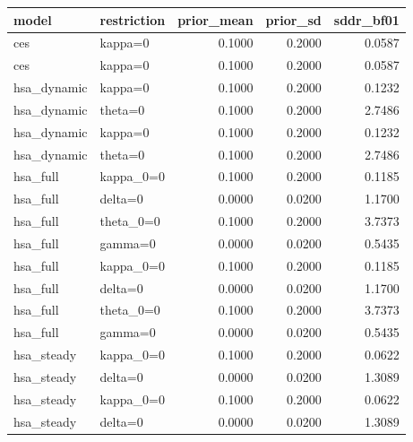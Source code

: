 \begin{tabular}{llrrr}
\toprule
model & restriction & prior\_mean & prior\_sd & sddr\_bf01 \\
\midrule
ces & kappa=0 & 0.1000 & 0.2000 & 0.0587 \\
ces & kappa=0 & 0.1000 & 0.2000 & 0.0587 \\
hsa\_dynamic & kappa=0 & 0.1000 & 0.2000 & 0.1232 \\
hsa\_dynamic & theta=0 & 0.1000 & 0.2000 & 2.7486 \\
hsa\_dynamic & kappa=0 & 0.1000 & 0.2000 & 0.1232 \\
hsa\_dynamic & theta=0 & 0.1000 & 0.2000 & 2.7486 \\
hsa\_full & kappa\_0=0 & 0.1000 & 0.2000 & 0.1185 \\
hsa\_full & delta=0 & 0.0000 & 0.0200 & 1.1700 \\
hsa\_full & theta\_0=0 & 0.1000 & 0.2000 & 3.7373 \\
hsa\_full & gamma=0 & 0.0000 & 0.0200 & 0.5435 \\
hsa\_full & kappa\_0=0 & 0.1000 & 0.2000 & 0.1185 \\
hsa\_full & delta=0 & 0.0000 & 0.0200 & 1.1700 \\
hsa\_full & theta\_0=0 & 0.1000 & 0.2000 & 3.7373 \\
hsa\_full & gamma=0 & 0.0000 & 0.0200 & 0.5435 \\
hsa\_steady & kappa\_0=0 & 0.1000 & 0.2000 & 0.0622 \\
hsa\_steady & delta=0 & 0.0000 & 0.0200 & 1.3089 \\
hsa\_steady & kappa\_0=0 & 0.1000 & 0.2000 & 0.0622 \\
hsa\_steady & delta=0 & 0.0000 & 0.0200 & 1.3089 \\
\bottomrule
\end{tabular}
